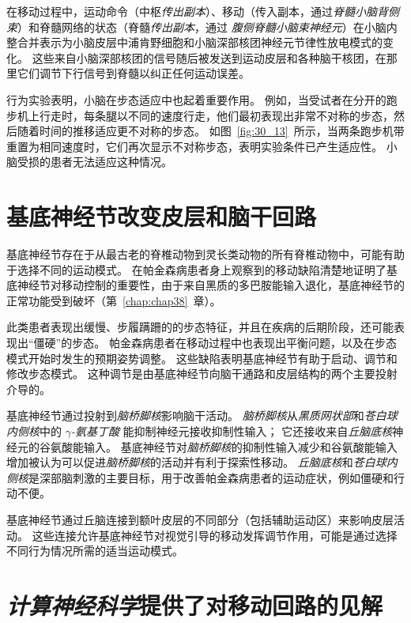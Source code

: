 在移动过程中，运动命令（中枢\textit{传出副本}）、移动（传入副本，通过\textit{脊髓小脑背侧束}）和脊髓网络的状态（脊髓\textit{传出副本}，通过 \textit{腹侧脊髓小脑束神经元}）在小脑内整合并表示为小脑皮层中浦肯野细胞和小脑深部核团神经元节律性放电模式的变化。
这些来自小脑深部核团的信号随后被发送到运动皮层和各种脑干核团，在那里它们调节下行信号到脊髓以纠正任何运动误差。


行为实验表明，小脑在步态适应中也起着重要作用。
例如，当受试者在分开的跑步机上行走时，每条腿以不同的速度行走，他们最初表现出非常不对称的步态，然后随着时间的推移适应更不对称的步态。
如图~\ref{fig:30_13}~所示，当两条跑步机带重置为相同速度时，它们再次显示不对称步态，表明实验条件已产生适应性。
小脑受损的患者无法适应这种情况。



\section{基底神经节改变皮层和脑干回路}

基底神经节存在于从最古老的脊椎动物到灵长类动物的所有脊椎动物中，可能有助于选择不同的运动模式。
在帕金森病患者身上观察到的移动缺陷清楚地证明了基底神经节对移动控制的重要性，由于来自黑质的多巴胺能输入退化，基底神经节的正常功能受到破坏（第~\ref{chap:chap38}~章）。


此类患者表现出缓慢、步履蹒跚的的步态特征，并且在疾病的后期阶段，还可能表现出“僵硬”的步态。
帕金森病患者在移动过程中也表现出平衡问题，以及在步态模式开始时发生的预期姿势调整。
这些缺陷表明基底神经节有助于启动、调节和修改步态模式。
这种调节是由基底神经节向脑干通路和皮层结构的两个主要投射介导的。


基底神经节通过投射到\textit{脑桥脚核}影响脑干活动。
\textit{脑桥脚核}从\textit{黑质网状部}和\textit{苍白球内侧核}中的 \textit{$\gamma$-氨基丁酸} 能抑制神经元接收抑制性输入；
它还接收来自\textit{丘脑底核}神经元的谷氨酸能输入。
基底神经节对\textit{脑桥脚核}的抑制性输入减少和谷氨酸能输入增加被认为可以促进\textit{脑桥脚核}的活动并有利于探索性移动。
\textit{丘脑底核}和\textit{苍白球内侧核}是深部脑刺激的主要目标，用于改善帕金森病患者的运动症状，例如僵硬和行动不便。


基底神经节通过丘脑连接到额叶皮层的不同部分（包括辅助运动区）来影响皮层活动。
这些连接允许基底神经节对视觉引导的移动发挥调节作用，可能是通过选择不同行为情况所需的适当运动模式。



\section{\textit{计算神经科学}提供了对移动回路的见解}

